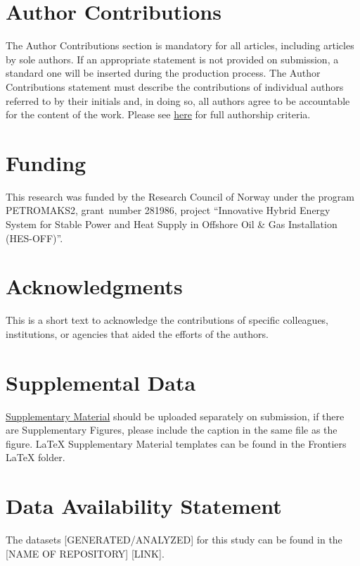 \documentclass[utf8]{frontiersSCNS} %
\begin{document}
\section*{Author Contributions}

The Author Contributions section is mandatory for all articles, including articles by sole authors. If an appropriate statement is not provided on submission, a standard one will be inserted during the production process. The Author Contributions statement must describe the contributions of individual authors referred to by their initials and, in doing so, all authors agree to be accountable for the content of the work. Please see  \href{http://home.frontiersin.org/about/author-guidelines#AuthorandContributors}{here} for full authorship criteria.

\section*{Funding}
This research was funded by the Research Council of Norway under the program PETROMAKS2, grant~number 281986, project ``Innovative Hybrid Energy System for Stable Power and Heat Supply in Offshore Oil \& Gas Installation (HES-OFF)''.

\section*{Acknowledgments}
This is a short text to acknowledge the contributions of specific colleagues, institutions, or agencies that aided the efforts of the authors.

\section*{Supplemental Data}
 \href{http://home.frontiersin.org/about/author-guidelines#SupplementaryMaterial}{Supplementary Material} should be uploaded separately on submission, if there are Supplementary Figures, please include the caption in the same file as the figure. LaTeX Supplementary Material templates can be found in the Frontiers LaTeX folder.

\section*{Data Availability Statement}
The datasets [GENERATED/ANALYZED] for this study can be found in the [NAME OF REPOSITORY] [LINK].
\end{document}
